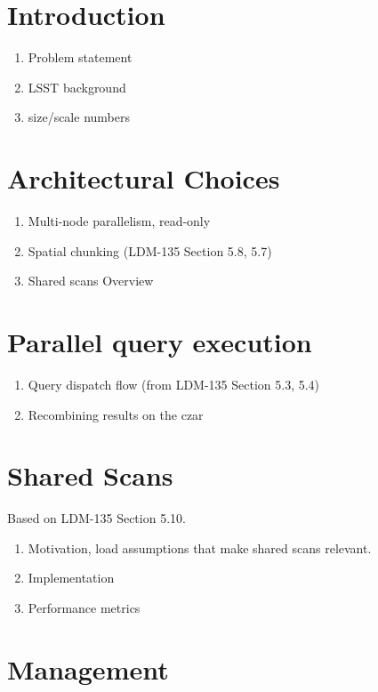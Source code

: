 \section{Introduction}

\begin{enumerate}
    \item Problem statement
    \item LSST background
    \item size/scale numbers
\end{enumerate}

\section{Architectural Choices}

\begin{enumerate}
    \item Multi-node parallelism, read-only
    \item Spatial chunking (LDM-135 Section 5.8, 5.7)
    \item Shared scans Overview
\end{enumerate}

\section{Parallel query execution}

\begin{enumerate}
    \item Query dispatch flow (from LDM-135 Section 5.3, 5.4)
    \item Recombining results on the czar
\end{enumerate}

\section{Shared Scans}

Based on LDM-135 Section 5.10.

\begin{enumerate}
    \item Motivation, load assumptions that make shared scans relevant.
    \item Implementation
    \item Performance metrics
\end{enumerate}

\section{Management}

